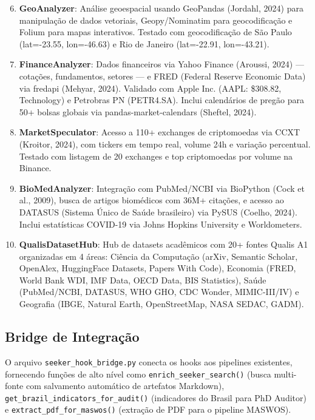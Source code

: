 \documentclass[12pt,a4paper]{article}
\begin{document}
\begin{enumerate}
  \setcounter{enumi}{5}
  \item \textbf{GeoAnalyzer}: Análise geoespacial usando GeoPandas (Jordahl, 2024) para manipulação de dados vetoriais, Geopy/Nominatim para geocodificação e Folium para mapas interativos. Testado com geocodificação de São Paulo (lat=-23.55, lon=-46.63) e Rio de Janeiro (lat=-22.91, lon=-43.21).

  \item \textbf{FinanceAnalyzer}: Dados financeiros via Yahoo Finance (Aroussi, 2024) — cotações, fundamentos, setores — e FRED (Federal Reserve Economic Data) via fredapi (Mehyar, 2024). Validado com Apple Inc. (AAPL: \$308.82, Technology) e Petrobras PN (PETR4.SA). Inclui calendários de pregão para 50+ bolsas globais via pandas-market-calendars (Sheftel, 2024).

  \item \textbf{MarketSpeculator}: Acesso a 110+ exchanges de criptomoedas via CCXT (Kroitor, 2024), com tickers em tempo real, volume 24h e variação percentual. Testado com listagem de 20 exchanges e top criptomoedas por volume na Binance.

  \item \textbf{BioMedAnalyzer}: Integração com PubMed/NCBI via BioPython (Cock et al., 2009), busca de artigos biomédicos com 36M+ citações, e acesso ao DATASUS (Sistema Único de Saúde brasileiro) via PySUS (Coelho, 2024). Inclui estatísticas COVID-19 via Johns Hopkins University e Worldometers.

  \item \textbf{QualisDatasetHub}: Hub de datasets acadêmicos com 20+ fontes Qualis A1 organizadas em 4 áreas: Ciência da Computação (arXiv, Semantic Scholar, OpenAlex, HuggingFace Datasets, Papers With Code), Economia (FRED, World Bank WDI, IMF Data, OECD Data, BIS Statistics), Saúde (PubMed/NCBI, DATASUS, WHO GHO, CDC Wonder, MIMIC-III/IV) e Geografia (IBGE, Natural Earth, OpenStreetMap, NASA SEDAC, GADM).
\end{enumerate}

\subsection{Bridge de Integração}

O arquivo \texttt{seeker\_hook\_bridge.py} conecta os hooks aos pipelines existentes, fornecendo funções de alto nível como \texttt{enrich\_seeker\_search()} (busca multi-fonte com salvamento automático de artefatos Markdown), \texttt{get\_brazil\_indicators\_for\_audit()} (indicadores do Brasil para PhD Auditor) e \texttt{extract\_pdf\_for\_maswos()} (extração de PDF para o pipeline MASWOS).
\end{document}
